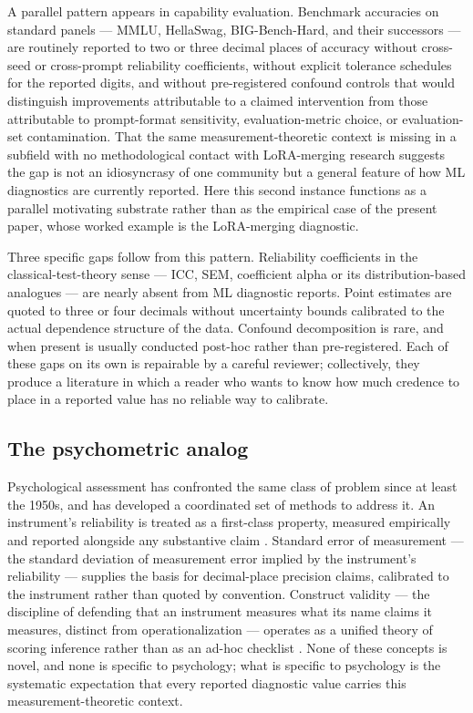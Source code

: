 \documentclass[10pt]{article}
\begin{document}
A parallel pattern appears in capability evaluation. Benchmark
accuracies on standard panels --- MMLU, HellaSwag,
BIG-Bench-Hard, and their successors --- are routinely reported
to two or three decimal places of accuracy without cross-seed or
cross-prompt reliability coefficients, without explicit tolerance
schedules for the reported digits, and without pre-registered
confound controls that would distinguish improvements attributable
to a claimed intervention from those attributable to prompt-format
sensitivity, evaluation-metric choice, or evaluation-set
contamination. That the same measurement-theoretic context is
missing in a subfield with no methodological contact with
LoRA-merging research suggests the gap is not an idiosyncrasy of
one community but a general feature of how ML diagnostics are
currently reported. Here this second instance functions as a
parallel motivating substrate rather than as the empirical case
of the present paper, whose worked example is the LoRA-merging
diagnostic.

Three specific gaps follow from this pattern. Reliability
coefficients in the classical-test-theory sense --- ICC, SEM,
coefficient alpha or its distribution-based analogues --- are
nearly absent from ML diagnostic reports. Point estimates are
quoted to three or four decimals without uncertainty bounds
calibrated to the actual dependence structure of the data. Confound
decomposition is rare, and when present is usually conducted
post-hoc rather than pre-registered. Each of these gaps on its own
is repairable by a careful reviewer; collectively, they produce a
literature in which a reader who wants to know how much credence to
place in a reported value has no reliable way to calibrate.

\subsection{The psychometric analog}

Psychological assessment has confronted the same class of problem
since at least the 1950s, and has developed a coordinated set of
methods to address it. An instrument's reliability is treated as a
first-class property, measured empirically and reported alongside any
substantive claim \citep{cronbach1951alpha,shrout1979icc}. Standard
error of measurement --- the standard deviation of measurement
error implied by the instrument's reliability --- supplies the
basis for decimal-place precision claims, calibrated to the
instrument rather than quoted by convention. Construct validity ---
the discipline of defending that an instrument measures what its
name claims it measures, distinct from operationalization ---
operates as a unified theory of scoring inference rather than as an
ad-hoc checklist \citep{messick1995validity,cronbachmeehl1955}.
None of these concepts is novel, and none is specific to psychology;
what is specific to psychology is the systematic expectation that
every reported diagnostic value carries this measurement-theoretic
context.
\end{document}
